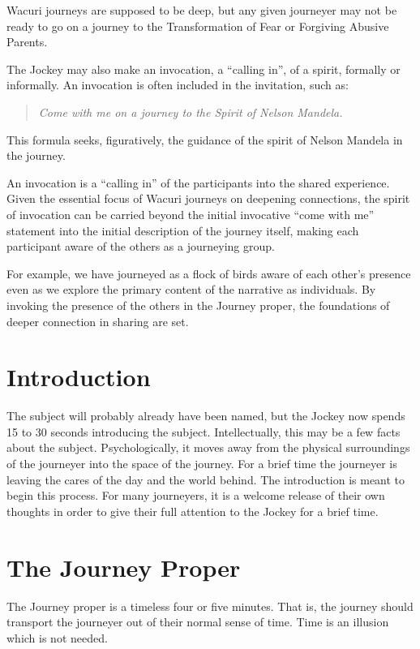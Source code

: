 \documentclass[12pt]{book}
\begin{document}
Wacuri journeys are supposed to be deep, but any given journeyer may not be ready to go on a journey to the Transformation of Fear
or Forgiving Abusive Parents.
					
The Jockey may also make an invocation, a “calling in”, of a spirit, formally or informally. An invocation is often included in the invitation, such as:

\begin{quote}{\em 
    Come with me on a journey to the Spirit of Nelson Mandela.}
    \end{quote}
					
This formula seeks, figuratively, the guidance of the spirit of Nelson Mandela in the journey.

An invocation is a ``calling in'' of the participants into the shared
experience. Given the essential focus of Wacuri journeys on deepening
connections, the spirit of invocation can be carried beyond the
initial invocative ``come with me'' statement into the initial
description of the journey itself, making each participant aware of
the others as a journeying group.

For example, we have journeyed as a flock of birds aware of each
other's presence even as we explore the primary content of the
narrative as individuals. By invoking the presence of the others in
the Journey proper, the foundations of deeper connection in sharing
are set.


\section{Introduction}
					
The subject will probably already have been named, but the Jockey now
spends 15 to 30 seconds introducing the subject. Intellectually, this
may be a few facts about the subject. Psychologically, it moves away
from the physical surroundings of the journeyer into the space of the
journey. For a brief time the journeyer is leaving the cares of the
day and the world behind. The introduction is meant to begin this
process. For many journeyers, it is a welcome release of their own
thoughts in order to give their full attention to the Jockey for a
brief time.
					
\section{The Journey Proper}
					
The Journey proper is a timeless four or five minutes. That is, the
journey should transport the journeyer out of their normal sense of
time. Time is an illusion which is not needed.
					
\end{document}
